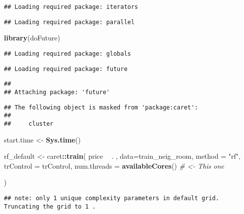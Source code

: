 \documentclass[
]{article}
\newenvironment{Shaded}{\begin{snugshade}}{\end{snugshade}}
\newcommand{\CommentTok}[1]{\textcolor[rgb]{0.56,0.35,0.01}{\textit{#1}}}
\newcommand{\DataTypeTok}[1]{\textcolor[rgb]{0.13,0.29,0.53}{#1}}
\newcommand{\KeywordTok}[1]{\textcolor[rgb]{0.13,0.29,0.53}{\textbf{#1}}}
\newcommand{\NormalTok}[1]{#1}
\newcommand{\OperatorTok}[1]{\textcolor[rgb]{0.81,0.36,0.00}{\textbf{#1}}}
\newcommand{\StringTok}[1]{\textcolor[rgb]{0.31,0.60,0.02}{#1}}
\begin{document}
\begin{verbatim}
## Loading required package: iterators
\end{verbatim}

\begin{verbatim}
## Loading required package: parallel
\end{verbatim}

\begin{Shaded}
\begin{Highlighting}[]
\KeywordTok{library}\NormalTok{(doFuture)}
\end{Highlighting}
\end{Shaded}

\begin{verbatim}
## Loading required package: globals
\end{verbatim}

\begin{verbatim}
## Loading required package: future
\end{verbatim}

\begin{verbatim}
## 
## Attaching package: 'future'
\end{verbatim}

\begin{verbatim}
## The following object is masked from 'package:caret':
## 
##     cluster
\end{verbatim}

\begin{Shaded}
\begin{Highlighting}[]
\NormalTok{start.time <-}\StringTok{ }\KeywordTok{Sys.time}\NormalTok{()}


\NormalTok{rf_default <-}\StringTok{ }\NormalTok{caret}\OperatorTok{::}\KeywordTok{train}\NormalTok{(}
\NormalTok{  price }\OperatorTok{~}\StringTok{ }\NormalTok{. ,}
  \DataTypeTok{data=}\NormalTok{train_neig_room,}
  \DataTypeTok{method =} \StringTok{"rf"}\NormalTok{,}
  \DataTypeTok{trControl =}\NormalTok{ trControl,}
  \DataTypeTok{num.threads =} \KeywordTok{availableCores}\NormalTok{() }\CommentTok{# <- This one}
  
\NormalTok{)}
\end{Highlighting}
\end{Shaded}

\begin{verbatim}
## note: only 1 unique complexity parameters in default grid. Truncating the grid to 1 .
\end{verbatim}
\end{document}

